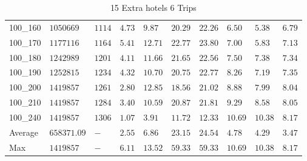 \begin{center}
\begin{table}[]
\begin{adjustwidth}{-0.4in}{-1in}
\begin{tabular}{|lll|l|l|ll|lll|}
100\_160 & $1050669  $ & $1114$ & $4.73$ & $9.87 $  & $20.29$    & $22.26$   & $6.50 $ & $5.38 $  & $6.79$ \\
100\_170 & $1177116  $ & $1164$ & $5.41$ & $12.71$  & $22.77$    & $23.80$   & $7.00 $ & $5.83 $  & $7.13$ \\
100\_180 & $1242989  $ & $1201$ & $4.11$ & $11.66$  & $21.65$    & $22.56$   & $7.50 $ & $7.38 $  & $7.34$ \\
100\_190 & $1252815  $ & $1234$ & $4.32$ & $10.70$  & $20.75$    & $22.77$   & $8.26 $ & $7.19 $  & $7.35$ \\
100\_200 & $1419857  $ & $1261$ & $2.80$ & $12.85$  & $18.56$    & $21.02$   & $8.88 $ & $7.99 $  & $8.04$ \\
100\_210 & $1419857  $ & $1284$ & $3.40$ & $10.59$  & $20.87$    & $21.81$   & $9.29 $ & $8.58 $  & $8.05$ \\
100\_240 & $1419857  $ & $1306$ & $1.07$ & $3.91 $  & $11.72$    & $12.33$   & $10.69$ & $10.38$  & $8.17$ \\
\hline
Average  & $658371.09$ & $-   $ & $2.55$ & $6.86 $  & $23.15$    & $24.54$   & $4.78 $ & $4.29 $  & $3.47$ \\
Max      & $1419857  $ & $-   $ & $6.11$ & $13.52$  & $59.33$    & $59.33$   & $10.69$ & $10.38$  & $8.17$ \\
\hline
\end{tabular}
    \end{adjustwidth}
    \caption{15 Extra hotels 6 Trips}
    \label{15-6}
    \end{table}
\end{center}
